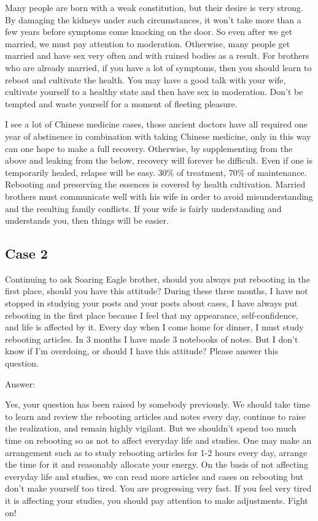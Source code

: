 \documentclass[
]{book}
\begin{document}
Many people are born with a weak constitution, but their desire is very strong. By damaging the kidneys under such circumstances, it won't take more than a few years before symptoms come knocking on the door. So even after we get married, we must pay attention to moderation. Otherwise, many people get married and have sex very often and with ruined bodies as a result. For brothers who are already married, if you have a lot of symptoms, then you should learn to reboot and cultivate the health. You may have a good talk with your wife, cultivate yourself to a healthy state and then have sex in moderation. Don't be tempted and waste yourself for a moment of fleeting pleasure.

I see a lot of Chinese medicine cases, those ancient doctors have all required one year of abstinence in combination with taking Chinese medicine, only in this way can one hope to make a full recovery. Otherwise, by supplementing from the above and leaking from the below, recovery will forever be difficult. Even if one is temporarily healed, relapse will be easy. 30\% of treatment, 70\% of maintenance. Rebooting and preserving the essences is covered by health cultivation. Married brothers must communicate well with his wife in order to avoid misunderstanding and the resulting family conflicts. If your wife is fairly understanding and understands you, then things will be easier.

\hypertarget{case-2-3}{%
\subsection{Case 2}\label{case-2-3}}

Continuing to ask Soaring Eagle brother, should you always put rebooting in the first place, should you have this attitude? During these three months, I have not stopped in studying your posts and your posts about cases, I have always put rebooting in the first place because I feel that my appearance, self-confidence, and life is affected by it. Every day when I come home for dinner, I must study rebooting articles. In 3 months I have made 3 notebooks of notes. But I don't know if I'm overdoing, or should I have this attitude? Please answer this question.

Answer:

Yes, your question has been raised by somebody previously. We should take time to learn and review the rebooting articles and notes every day, continue to raise the realization, and remain highly vigilant. But we shouldn't spend too much time on rebooting so as not to affect everyday life and studies. One may make an arrangement such as to study rebooting articles for 1-2 hours every day, arrange the time for it and reasonably allocate your energy. On the basis of not affecting everyday life and studies, we can read more articles and cases on rebooting but don't make yourself too tired. You are progressing very fast. If you feel very tired it is affecting your studies, you should pay attention to make adjustments. Fight on!
\end{document}
